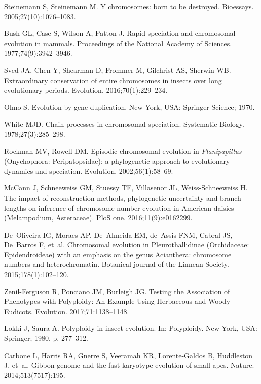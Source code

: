 \documentclass[]{rsos}%
\begin{document}
\begin{thebibliography}{9}
Steinemann S, Steinemann M.
 Y chromosomes: born to be destroyed.
 Bioessays. 2005;27(10):1076--1083.

Bush GL, Case S, Wilson A, Patton J.
 Rapid speciation and chromosomal evolution in mammals.
 Proceedings of the National Academy of Sciences.
  1977;74(9):3942--3946.

Sved JA, Chen Y, Shearman D, Frommer M, Gilchrist AS, Sherwin WB.
 Extraordinary conservation of entire chromosomes in insects over long
  evolutionary periods.
 Evolution. 2016;70(1):229--234.

Ohno S.
 Evolution by gene duplication.
 New York, USA: Springer Science; 1970.

White MJD.
 Chain processes in chromosomal speciation.
 Systematic Biology. 1978;27(3):285--298.

Rockman MV, Rowell DM.
 Episodic chromosomal evolution in \emph{{P}lanipapillus}
  ({O}nychophora: {P}eripatopsidae): a phylogenetic approach to evolutionary
  dynamics and speciation.
 Evolution. 2002;56(1):58--69.

McCann J, Schneeweiss GM, Stuessy TF, Villasenor JL, Weiss-Schneeweiss H.
 The impact of reconstruction methods, phylogenetic uncertainty and
  branch lengths on inference of chromosome number evolution in American
  daisies (Melampodium, Asteraceae).
 PloS one. 2016;11(9):e0162299.

De~Oliveira IG, Moraes AP, De~Almeida EM, de~Assis FNM, Cabral JS, De~Barros F,
  et~al.
 Chromosomal evolution in Pleurothallidinae (Orchidaceae:
  Epidendroideae) with an emphasis on the genus Acianthera: chromosome numbers
  and heterochromatin.
 Botanical journal of the Linnean Society. 2015;178(1):102--120.

Zenil-Ferguson R, Ponciano JM, Burleigh JG.
 Testing the Association of Phenotypes with Polyploidy: An Example
  Using Herbaceous and Woody Eudicots.
 Evolution. 2017;71:1138--1148.

Lokki J, Saura A.
 Polyploidy in insect evolution.
 In: Polyploidy. New York, USA: Springer; 1980. p. 277--312.

Carbone L, Harris RA, Gnerre S, Veeramah KR, Lorente-Galdos B, Huddleston J,
  et~al.
 Gibbon genome and the fast karyotype evolution of small apes.
 Nature. 2014;513(7517):195.


\end{thebibliography}
\end{document}
